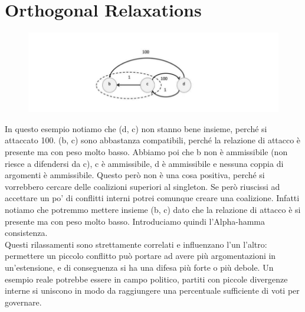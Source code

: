     \section{Orthogonal Relaxations}
    \begin{figure}[H]
        \centering
        \includegraphics[width=12cm, keepaspectratio]{img/Cap6/ortogonal.png}
    \end{figure}
    \noindent In questo esempio notiamo che (d, c) non stanno bene insieme, perché si attaccato 100. (b, c) sono abbastanza compatibili, perché la relazione di attacco è presente ma con peso molto basso. Abbiamo poi che b non è ammissibile (non riesce a difendersi da c), c è ammissibile, d è ammissibile e nessuna
    coppia di argomenti è ammissibile. Questo però non è una cosa positiva, perché si vorrebbero cercare delle coalizioni superiori al singleton. Se però riuscissi ad accettare un po' di conflitti interni potrei comunque creare una coalizione. Infatti notiamo che potremmo mettere insieme (b, c) dato che
    la relazione di attacco è si presente ma con peso molto basso. Introduciamo quindi l'Alpha-hamma consistenza.\\
    Questi rilassamenti sono strettamente correlati
    e influenzano l'un l'altro: permettere un piccolo conflitto può portare ad avere più
    argomentazioni in un'estensione, e di conseguenza si ha una difesa più forte o più debole.
    Un esempio reale potrebbe essere in campo politico, partiti con piccole divergenze
    interne si uniscono in modo da raggiungere una percentuale sufficiente di voti per
    governare.

